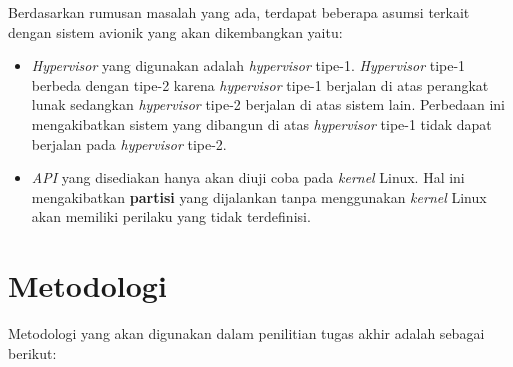 Berdasarkan rumusan masalah yang ada, terdapat beberapa asumsi terkait dengan sistem avionik yang akan
dikembangkan yaitu:

\begin{itemize}

    \item \textit{Hypervisor} yang digunakan adalah \textit{hypervisor} tipe-1. \textit{Hypervisor} tipe-1 berbeda
        dengan tipe-2 karena \textit{hypervisor} tipe-1 berjalan di atas perangkat lunak sedangkan \textit{hypervisor}
        tipe-2 berjalan di atas sistem lain. Perbedaan ini mengakibatkan sistem yang dibangun di atas
        \textit{hypervisor} tipe-1 tidak dapat berjalan pada \textit{hypervisor} tipe-2.

    \item \textit{API} yang disediakan hanya akan diuji coba pada \textit{kernel} Linux. Hal ini mengakibatkan
        \textbf{partisi} yang dijalankan tanpa menggunakan \textit{kernel} Linux akan memiliki perilaku yang tidak
        terdefinisi.

\end{itemize}

\section{Metodologi}

Metodologi yang akan digunakan dalam penilitian tugas akhir adalah sebagai berikut:

